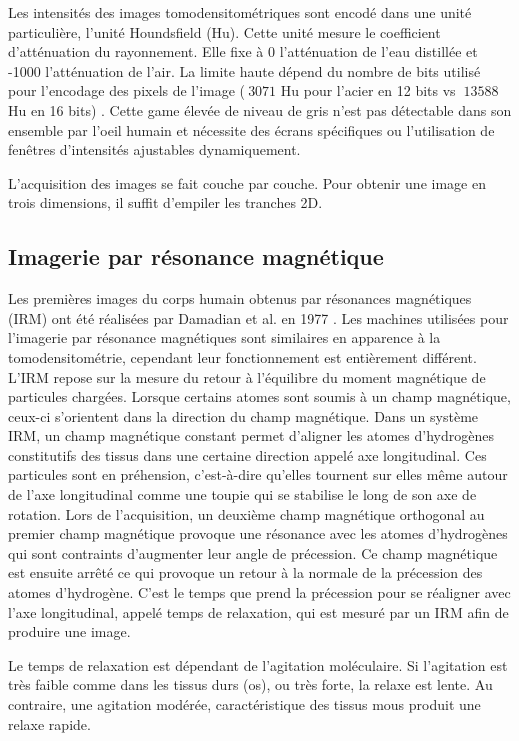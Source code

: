 Les intensités des images tomodensitométriques sont encodé dans une unité particulière, l'unité Houndsfield (Hu). Cette unité mesure le coefficient d'atténuation du rayonnement. Elle fixe à 0 l'atténuation de l'eau distillée et -1000 l'atténuation de l'air. La limite haute dépend du nombre de bits utilisé pour l'encodage des pixels de l'image ($~3071$ Hu pour l'acier en 12 bits vs $~13588$ Hu en 16 bits) \cite{Glide2013_metal_saturation}. Cette game élevée de niveau de gris n'est pas détectable dans son ensemble par l'oeil humain et nécessite des écrans spécifiques ou l'utilisation de fenêtres d'intensités ajustables dynamiquement.

L'acquisition des images se fait couche par couche. Pour obtenir une image en trois dimensions, il suffit d'empiler les tranches 2D.

\subsection{Imagerie par résonance magnétique}
\label{sec:contexte:images:irm}

Les premières images du corps humain obtenus par résonances magnétiques (IRM) ont été réalisées par Damadian et al. en 1977 \cite{Damadian1977_NMRI}. Les machines utilisées pour l'imagerie par résonance magnétiques sont similaires en apparence à la tomodensitométrie, cependant leur fonctionnement est entièrement différent. L'IRM repose sur la mesure du retour à l'équilibre du moment magnétique de particules chargées. Lorsque certains atomes sont soumis à un champ magnétique, ceux-ci s'orientent dans la direction du champ magnétique. Dans un système IRM, un champ magnétique constant permet d'aligner les atomes d'hydrogènes constitutifs des tissus dans une certaine direction appelé axe longitudinal. Ces particules sont en préhension, c'est-à-dire qu'elles tournent sur elles même autour de l'axe longitudinal comme une toupie qui se stabilise le long de son axe de rotation. Lors de l'acquisition, un deuxième champ magnétique orthogonal au premier champ magnétique provoque une résonance avec les atomes d'hydrogènes qui sont contraints d'augmenter leur angle de précession. Ce champ magnétique est ensuite arrêté ce qui provoque un retour à la normale de la précession des atomes d'hydrogène. C'est le temps que prend la précession pour se réaligner avec l'axe longitudinal, appelé temps de relaxation, qui est mesuré par un IRM afin de produire une image.

Le temps de relaxation est dépendant de l'agitation moléculaire. Si l'agitation est très faible comme dans les tissus durs (os), ou très forte, la relaxe est lente. Au contraire, une agitation modérée, caractéristique des tissus mous produit une relaxe rapide.


